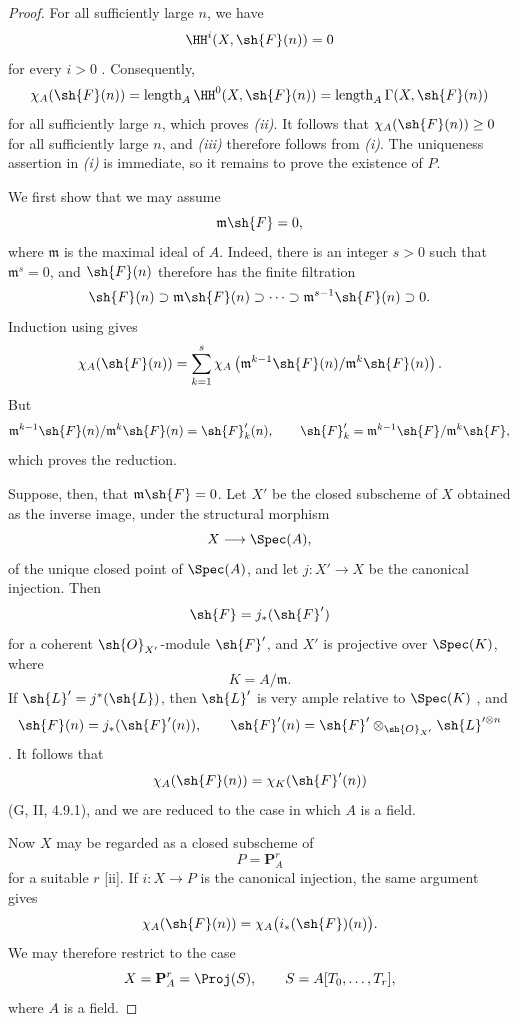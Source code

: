 \begin{proof}
For all sufficiently large $n$, we have
\[
  \HH^i(X,\sh{F}(n))=0
\]
for every $i>0$ .
Consequently,
\[
  \chi_A(\sh{F}(n))
  =
  \operatorname{length}_A\HH^0(X,\sh{F}(n))
  =
  \operatorname{length}_A\Gamma(X,\sh{F}(n))
\]
for all sufficiently large $n$, which proves \emph{(ii)}.
It follows that $\chi_A(\sh{F}(n))\geq0$ for all sufficiently large $n$, and \emph{(iii)} therefore follows from \emph{(i)}.
The uniqueness assertion in \emph{(i)} is immediate, so it remains to prove the existence of $P$.

We first show that we may assume
\[
  \mathfrak{m}\sh{F}=0,
\]
where $\mathfrak{m}$ is the maximal ideal of $A$.
Indeed, there is an integer $s>0$ such that $\mathfrak{m}^s=0$, and $\sh{F}(n)$ therefore has the finite filtration
\[
  \sh{F}(n)
  \supset\mathfrak{m}\sh{F}(n)
  \supset\cdots
  \supset\mathfrak{m}^{s-1}\sh{F}(n)
  \supset0.
\]
Induction using  gives
\[
  \chi_A(\sh{F}(n))
  =
  \sum_{k=1}^{s}
  \chi_A\left(
    \mathfrak{m}^{k-1}\sh{F}(n)/
    \mathfrak{m}^{k}\sh{F}(n)
  \right).
\]
But
\[
  \mathfrak{m}^{k-1}\sh{F}(n)/
  \mathfrak{m}^{k}\sh{F}(n)
  =
  \sh{F}'_k(n),
  \qquad
  \sh{F}'_k=
  \mathfrak{m}^{k-1}\sh{F}/\mathfrak{m}^{k}\sh{F},
\]
which proves the reduction.

Suppose, then, that $\mathfrak{m}\sh{F}=0$.
Let $X'$ be the closed subscheme of $X$ obtained as the inverse image, under the structural morphism
\[
  X\longrightarrow\Spec(A),
\]
of the unique closed point of $\Spec(A)$, and let $j:X'\to X$ be the canonical injection.
Then
\[
  \sh{F}=j_*(\sh{F}')
\]
for a coherent $\sh{O}_{X'}$-module $\sh{F}'$, and $X'$ is projective over $\Spec(K)$, where
\[
  K=A/\mathfrak{m}.
\]
If $\sh{L}'=j^*(\sh{L})$, then $\sh{L}'$ is very ample relative to $\Spec(K)$ , and
\[
  \sh{F}(n)=j_*(\sh{F}'(n)),
  \qquad
  \sh{F}'(n)
  =
  \sh{F}'\otimes_{\sh{O}_{X'}}\sh{L}'^{\otimes n}
\]
.
It follows that
\[
  \chi_A(\sh{F}(n))
  =
  \chi_K(\sh{F}'(n))
\]
(G, II, 4.9.1), and we are reduced to the case in which $A$ is a field.

Now $X$ may be regarded as a closed subscheme of
\[
  P=\mathbf{P}_A^r
\]
for a suitable $r$ [ii].
If $i:X\to P$ is the canonical injection, the same argument gives
\[
  \chi_A(\sh{F}(n))
  =
  \chi_A\bigl(i_*(\sh{F})(n)\bigr).
\]
We may therefore restrict to the case
\[
  X=\mathbf{P}_A^r=\Proj(S),
  \qquad
  S=A[T_0,\ldots,T_r],
\]
where $A$ is a field.


\end{proof}
